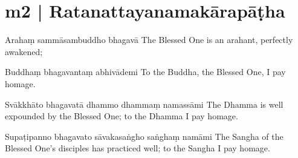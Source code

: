 
\section*{m2 | Ratanattayanamakārapāṭha}\label{sec:m02}

\begin{chantsubsection}
  \chantline
    {Arahaṃ sammāsambuddho bhagavā}
    {The Blessed One is an arahant, perfectly awakened;}

  \chantlineinline
    {Buddhaṃ bhagavantaṃ abhivādemi}
    {To the Buddha, the Blessed One, I pay homage.}

  \chantlineinline
    {Svākkhāto bhagavatā dhammo dhammaṃ namassāmi}
    {The Dhamma is well expounded by the Blessed One; to the Dhamma I pay homage.}

  \chantline
    {Supaṭipanno bhagavato sāvakasaṅgho saṅghaṃ namāmi}
    {The Sangha of the Blessed One’s disciples has practiced well; to the Sangha I pay homage.}

\end{chantsubsection}
